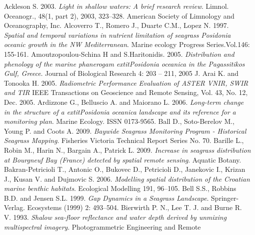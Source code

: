 \documentclass[10pt, a4paper]{article}
\begin{document}
\begin{thebibliography}{999}
\label{bib}


Ackleson S. 2003. \emph{Light in shallow waters: A brief research review}. Limnol. Oceanogr.,
48(1, part 2), 2003, 323–328. American Society of Limnology and Oceanography, Inc. \pageref{Ackleson, 2003}
Alcoverro T., Romero J., Duarte C.M., Lopez N. 1997. \emph{Spatial and temporal variations
in nutrient limitation of seagrass Posidonia oceanic growth in the NW Mediterranean}.
Marine ecology Progress Series.Vol.146: 155-161. \pageref{}
Amoutzopoulou-Schina H and S.Haritonidis. 2005. \emph{Distribution and phenology of the
marine phanerogam \textit{	extit{Posidonia oceanica}} in the Pagassitikos Gulf, Greece}. Journal of
Biological Research 4: 203 – 211, 2005 J. \pageref{Amoutzopoulou-Schina05}
Arai K. and Tonooka H. 2005. \emph{Radiometric Performance Evaluation of ASTER VNIR, SWIR and TIR} 
IEEE Transactions on Geoscience and Remote Sensing, Vol. 43, No. 12, Dec. 2005. \pageref{Arai05}
Ardizzone G., Belluscio A. and Maiorano L. 2006. \emph{Long-term change in the structure of
a \textit{	extit{Posidonia oceanica}} landscape and its reference for a monitoring plan}. Marine Ecology.
ISSN 0173-9565. \pageref{Ardizzone06}
Ball D., Soto-Berelov M., Young P. and Coots A. 2009. \emph{Baywide Seagrass Monitoring
Program - Historical Seagrass Mapping}. Fisheries Victoria Technical Report Series No. 70. \pageref{Ball09}
Barille L., Robin M., Harin N., Bargain A., Patrick L. 2009. \emph{Increase in seagrass
distribution at Bourgneuf Bay (France) detected by spatial remote sensing}. Aquatic Botany. \pageref{Barille09}
Bakran-Petricioli T., Antonic O., Bukovec D., Petricioli D., Janekovic I., Krizan J.,
Kusan V. and Dujmovic S. 2006. \emph{Modelling spatial distribution of the Croatian marine
benthic habitats}. Ecological Modelling 191, 96–105. \pageref{Bakran-Petricioli06}
Bell S.S., Robbins B.D. and Jensen S.L. 1999. \emph{Gap Dynamics in a Seagrass Landscape}.
Springer-Verlag. Ecosystems (1999) 2: 493–504. \pageref{Bell99}
Bierwirth P. N., Lee T. J. and Burne R. V. 1993. \emph{Shalow sea-floor reflectance and water
depth derived by unmixing multispectral imagery}. Photogrammetric Engineering and Remote

\end{thebibliography}
\end{document}
